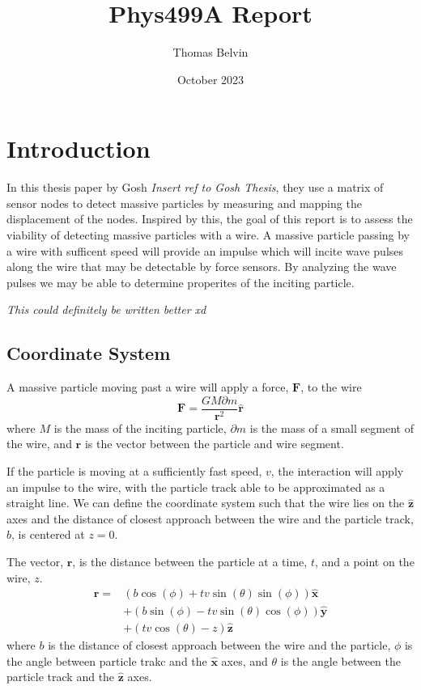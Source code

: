 \documentclass{report}
\title{Phys499A Report}
\author{Thomas Belvin}
\date{October 2023}
\begin{document}
\maketitle
\chapter*{Introduction}
In this thesis paper by Gosh \emph{Insert ref to Gosh Thesis}, they use a matrix of sensor nodes to detect massive particles by measuring and mapping the displacement of the nodes.
Inspired by this, the goal of this report is to assess the viability of detecting massive particles with a wire.
A massive particle passing by a wire with sufficent speed will provide an impulse which will incite wave pulses along the wire that may be detectable by force sensors. 
By analyzing the wave pulses we may be able to determine properites of the inciting particle.

\emph{This could definitely be written better xd}
\section*{Coordinate System}
A massive particle moving past a wire will apply a force, $\mathbf{F}$, to the wire 
\begin{equation}
    \mathbf{F} = \frac{G M \partial m}{\mathbf{r}^2} \mathbf{\hat r}
    \label{eqn:force}
\end{equation}
where $M$ is the mass of the inciting particle, $\partial m$ is the mass of a small segment of the wire, and $\mathbf{r}$ is the vector between the particle and wire segment.

If the particle is moving at a sufficiently fast speed, $v$, the  interaction will apply an impulse to the wire, with the particle track able to be approximated as a straight line. 
We can define the coordinate system such that the wire lies on the $\mathbf{\hat z}$ axes and the distance of closest approach between the wire and the particle track, $b$, is centered at $z = 0$.

The vector, $\mathbf{r}$, is the distance between the particle at a time, $t$, and a point on the wire, $z$.
\begin{align}
    \nonumber \mathbf{r}=& (b \cos (\phi )+t v \sin (\theta ) \sin (\phi )) \mathbf{\hat x} \\
               \nonumber & +(b \sin (\phi )-t v \sin (\theta ) \cos (\phi )) \mathbf{\hat y}\\
                         & + (t v \cos (\theta )-z) \mathbf{\hat z}
    \label{eqn:r}
\end{align}
where $b$ is the distance of closest approach between the wire and the particle, $\phi$ is the angle between particle trakc and the $\mathbf{\hat x}$ axes, and $\theta$ is the angle between the particle track and the $\mathbf{\hat z}$ axes.
\end{document}
